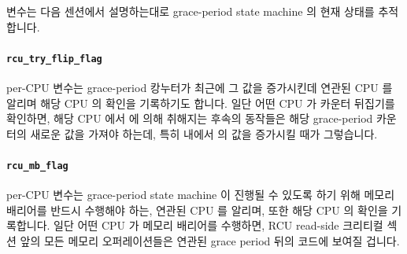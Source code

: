  변수는 다음 센션에서 설명하는대로 grace-period state
machine 의 현재 상태를 추적합니다.

\paragraph{{\tt rcu\_try\_flip\_flag}}
\label{app:rcuimpl:rcu_try_flip_flag}

 per-CPU 변수는 grace-period 캉누터가 최근에 그 값을
증가시킨데 연관된 CPU 를 알리며 해당 CPU 의 확인을 기록하기도 합니다.
일단 어떤 CPU 가 카운터 뒤집기를 확인하면, 해당 CPU 에서 
에 의해 취해지는 후속의 동작들은 해당 grace-period 카운터의 새로운 값을 가져야
하는데, 특히  내에서  의 값을 증가시킬 때가
그렇습니다.

\paragraph{{\tt rcu\_mb\_flag}}
\label{app:rcuimpl:rcu_mb_flag}

 per-CPU 변수는 grace-period state machine 이 진행될 수 있도록
하기 위해 메모리 배리어를 반드시 수행해야 하는, 연관된 CPU 를 알리며, 또한 해당
CPU 의 확인을 기록합니다.
일단 어떤 CPU 가 메모리 배리어를 수행하면, RCU read-side 크리티컬 섹션 앞의
모든 메모리 오퍼레이션들은 연관된 grace period 뒤의 코드에 보여질 겁니다.

